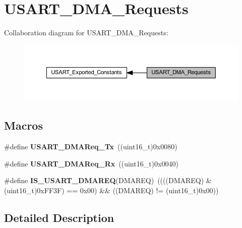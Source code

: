 \hypertarget{group___u_s_a_r_t___d_m_a___requests}{}\section{U\+S\+A\+R\+T\+\_\+\+D\+M\+A\+\_\+\+Requests}
\label{group___u_s_a_r_t___d_m_a___requests}
Collaboration diagram for U\+S\+A\+R\+T\+\_\+\+D\+M\+A\+\_\+\+Requests\+:
\nopagebreak
\begin{figure}[H]
\begin{center}
\leavevmode
\includegraphics[width=350pt]{group___u_s_a_r_t___d_m_a___requests}
\end{center}
\end{figure}
\subsection*{Macros}
\begin{DoxyCompactItemize}
\item 
\mbox{\label{group___u_s_a_r_t___d_m_a___requests_gae38097d8f82ba969c9812194022cae9a}} 
\#define {\bfseries U\+S\+A\+R\+T\+\_\+\+D\+M\+A\+Req\+\_\+\+Tx}~((uint16\+\_\+t)0x0080)
\item 
\mbox{\label{group___u_s_a_r_t___d_m_a___requests_gaf33c13abb942251afab3297d8b8362ca}} 
\#define {\bfseries U\+S\+A\+R\+T\+\_\+\+D\+M\+A\+Req\+\_\+\+Rx}~((uint16\+\_\+t)0x0040)
\item 
\mbox{\label{group___u_s_a_r_t___d_m_a___requests_ga8be7a899d21d82de2ee0a763b4564dc3}} 
\#define {\bfseries I\+S\+\_\+\+U\+S\+A\+R\+T\+\_\+\+D\+M\+A\+R\+EQ}(D\+M\+A\+R\+EQ)~((((D\+M\+A\+R\+EQ) \& (uint16\+\_\+t)0x\+F\+F3\+F) == 0x00) \&\& ((\+D\+M\+A\+R\+E\+Q) != (uint16\+\_\+t)0x00))
\end{DoxyCompactItemize}


\subsection{Detailed Description}
